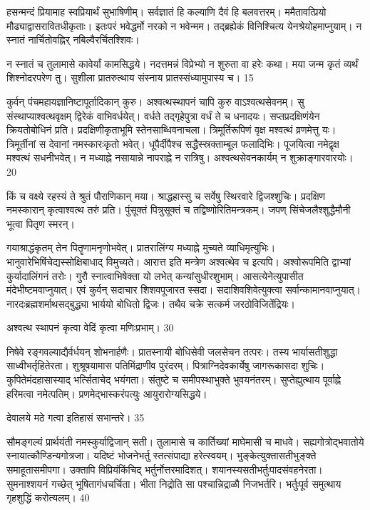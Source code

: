   हसन्मन्दं प्रियामाह स्वप्रियार्थं सुभाषिणीम्।
 सर्वज्ञातं हि कल्याणि दैवं हि बलवत्तरम्।
 ममैतावत्प्रियो मौढ्याद्वासरावितधीकृताः।
 इतःपरं भवेद्धर्मो नरको न भवेन्मम।
 तद्ब्रह्येकं विनिश्चित्य येनश्रेयोहमाप्नुयाम्।
 न स्नातं नार्चितोवह्निर् नबिल्वैरर्चितश्शिवः।
 
न स्नातं च तुलामासे कावेर्यां कामसिद्धये।
 नदत्तमन्नं विप्रेभ्यो न शुरुता वा हरेः कथा।
 मया जन्म कृतं व्यर्थं शिश्नोदरपरेण तु।
 सुशीला
प्रातरुत्थाय संस्नाय प्रातस्संध्यामुपास्य च।
 15

  कुर्वन् पंचमहायज्ञानिष्टापूर्तादिकान् कुरु।
 अश्वत्थस्थापनं चापि कुरु वाऽश्वत्थसेवनम्।
 सु संस्थाप्याश्वत्थवृक्षम् द्विरेकं वाभिवर्धयेत्।
 वर्धते तद्गृहेपुत्रा वर्धं ते च धनादयः।
 सप्तप्रदक्षिणंयेन क्रियतोबोधिनं प्रति।
 प्रदक्षिणीकृताभूमि स्तेनसाब्धिवनाचला।
 त्रिमूर्तिरूपिणं वृक्ष मश्वत्थं व्रणमेत्तु यः।
 त्रिमूर्तीनां स देवानां नमस्कारःकृतो भवेत्।
 धूपैर्दीपैश्च सद्धैस्स्रक्ताम्बूल फलादिभिः।
 पूजयित्वा नमेद्वृक्ष मश्वत्थं सधनीभवेत्।
 न मध्याह्ने नसायान्ने नापराह्ने न रात्रिषु।
 अश्वत्थसेवनकार्यम् न शुक्राङ्गारवारयोः।
 20

  किं च वक्ष्ये रहस्यं ते श्रुतं पौराणिकान् मया।
 श्राद्धहास्सु च सर्वेषु स्थिरवारे द्विजश्शुचिः।
 प्रदक्षिण नमस्कारान् कृत्वाश्वत्थ तरुं प्रति।
 पुंसूक्तं पित्रुसूक्तं च तद्विष्णोरितिमन्त्रकम्।
 जपण् सिंचेजलैश्शुद्धैमौनी भूत्वा पितृण स्मरन्।
 
गयाश्राद्धंकृतम् तेन पितॄणामनृणोभवेत्।
 प्रातरालिंग्य मध्याह्ने मुच्यते व्याधिमृत्युभिः।
 भानुवारेभिषिंचेद्यस्सोक्षिबाधाद् विमुच्यते।
 आरात्त इति मन्त्रेण अश्वत्थेव च इत्यपि।
 अश्वोरूपमिति द्वाभ्यां कुर्यादालिंगनं तरोः।
 गुरौ स्नात्वाभिषेक्ता यो लभेत् कन्यांसुधीरशुभाम्।
 आसत्येनेत्युपासीत मंदेभीष्टमवाप्नुयात्।
 एवं कुर्वन् सदाचार शिशवपूजारत स्सदा।
 सदाशिवशिवेत्युक्त्वा सर्वान्कामानवाप्नुयात्।
 नारदःब्रह्मशर्माथसद्बुद्ध्या भार्ययो बोधितो द्विजः।
 तथैव चक्रे सत्कर्म जरठोविजितेंद्रियः।
 
अश्वत्थ स्थापनं कृत्वा वेदिं कृत्वा मणिःप्रभाम्।
30

 निषेवे रङ्गवल्याद्यैर्वर्धयन् शोभनार्हणैः।
 प्रातस्नायी बोधिसेवी जलसेचन तत्परः।
 तस्य भार्यासतीशुद्धा साध्वीभर्तृहितेरता।
 शुश्रूषयामास पतिमिंद्राणीव पुरंदरम्।
 पित्राग्निदेवकार्येषु जागरूकासदा शुचिः।
 कुपितेमंदहासास्याद् भर्त्सिताचेद् भयंगता।
 संतुष्टे च समीपस्थाभुक्ते भुवयनंतरम्।
 सुप्तेह्युत्थाय पूर्वाह्ने हरिमत्वा नमेत्पतिम्।
 प्रणमेद्भास्करंपत्युः आयुरारोग्यसिद्धये।
 
देवालये मठे गत्वा इतिहासं सभान्तरे।
 35

  सौमङ्गल्यं प्रार्थयंती नमस्कुर्याद्विजान् सती।
 तुलामासे च कार्तिख्यां माघेमासी च माधवे।
 सह्यगोत्रोद्भवातोये स्नायात्कौण्डिन्यगोत्रजा।
 यदिष्टं भोजनेभर्तु स्तत्संपाद्या हरेत्स्वयम्।
 भुङ्केत्युक्तासतीभुङ्क्ते समाहूतासमीपगा।
 उक्तापि विप्रियंकिंचिद् भर्तुर्नोत्तरमादिशत्।
 शयानस्यसतीभर्तुःपादसंवहनेरता।
 सुमनाश्शयनं गच्छेत् भूषितागंधचर्चिता।
 भीता निद्रोति सा पश्चान्निद्राळौ निजभर्तरि।
 भर्तुःपूर्व समुत्थाय गृहशुद्धिं करोत्यलम्।
 40


